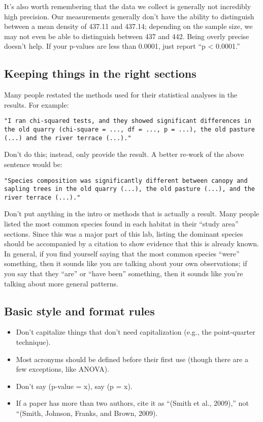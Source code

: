 \documentclass[]{book}
\providecommand{\tightlist}{%
  \setlength{\itemsep}{0pt}\setlength{\parskip}{0pt}}
\begin{document}
It's also worth remembering that the data we collect is generally not
incredibly high precision. Our measurements generally don't have the
ability to distinguish between a mean density of 437.11 and 437.14;
depending on the sample size, we may not even be able to distinguish
between 437 and 442. Being overly precise doesn't help. If your p-values
are less than 0.0001, just report ``p \textless{} 0.0001.''

\subsection{Keeping things in the right
sections}\label{keeping-things-in-the-right-sections}

Many people restated the methods used for their statistical analyses in
the results. For example:

\begin{verbatim}
"I ran chi-squared tests, and they showed significant differences in the old quarry (chi-square = ..., df = ..., p = ...), the old pasture (...) and the river terrace (...)." 
\end{verbatim}

Don't do this; instead, only provide the result. A better re-work of the
above sentence would be:

\begin{verbatim}
"Species composition was significantly different between canopy and sapling trees in the old quarry (...), the old pasture (...), and the river terrace (...)."
\end{verbatim}

Don't put anything in the intro or methods that is actually a result.
Many people listed the most common species found in each habitat in
their ``study area'' sections. Since this was a major part of this lab,
listing the dominant species should be accompanied by a citation to show
evidence that this is already known. In general, if you find yourself
saying that the most common species ``were'' something, then it sounds
like you are talking about your own observations; if you say that they
``are'' or ``have been'' something, then it sounds like you're talking
about more general patterns.

\subsection{Basic style and format
rules}\label{basic-style-and-format-rules}

\begin{itemize}
\tightlist
\item
  Don't capitalize things that don't need capitalization (e.g., the
  point-quarter technique).
\item
  Most acronyms should be defined before their first use (though there
  are a few exceptions, like ANOVA).
\item
  Don't say (p-value = x), say (p = x).
\item
  If a paper has more than two authors, cite it as ``(Smith et al.,
  2009),'' not ``(Smith, Johnson, Franks, and Brown, 2009).
\end{itemize}
\end{document}
